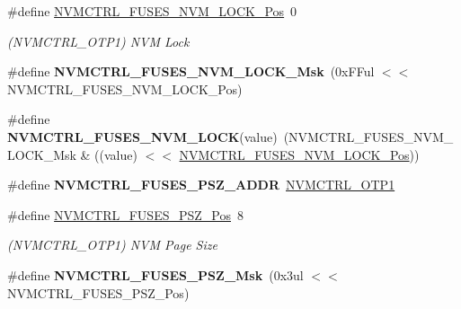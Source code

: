 \begin{DoxyCompactItemize}
\item 
\hypertarget{group__fuses__api_ga54fc50fd04594f4183baf9a51d5ff8e9}{}\#define \hyperlink{group__fuses__api_ga54fc50fd04594f4183baf9a51d5ff8e9}{N\+V\+M\+C\+T\+R\+L\+\_\+\+F\+U\+S\+E\+S\+\_\+\+N\+V\+M\+\_\+\+L\+O\+C\+K\+\_\+\+Pos}~0\label{group__fuses__api_ga54fc50fd04594f4183baf9a51d5ff8e9}

\begin{DoxyCompactList}\small\item\em (N\+V\+M\+C\+T\+R\+L\+\_\+\+O\+T\+P1) N\+V\+M Lock \end{DoxyCompactList}\item 
\hypertarget{group__fuses__api_ga2a99d48671efe5519af35a0749175ddd}{}\#define {\bfseries N\+V\+M\+C\+T\+R\+L\+\_\+\+F\+U\+S\+E\+S\+\_\+\+N\+V\+M\+\_\+\+L\+O\+C\+K\+\_\+\+Msk}~(0x\+F\+Ful $<$$<$ N\+V\+M\+C\+T\+R\+L\+\_\+\+F\+U\+S\+E\+S\+\_\+\+N\+V\+M\+\_\+\+L\+O\+C\+K\+\_\+\+Pos)\label{group__fuses__api_ga2a99d48671efe5519af35a0749175ddd}

\item 
\hypertarget{group__fuses__api_ga518470e6884a1b5a283df85948352b4d}{}\#define {\bfseries N\+V\+M\+C\+T\+R\+L\+\_\+\+F\+U\+S\+E\+S\+\_\+\+N\+V\+M\+\_\+\+L\+O\+C\+K}(value)~(N\+V\+M\+C\+T\+R\+L\+\_\+\+F\+U\+S\+E\+S\+\_\+\+N\+V\+M\+\_\+\+L\+O\+C\+K\+\_\+\+Msk \& ((value) $<$$<$ \hyperlink{group__fuses__api_ga54fc50fd04594f4183baf9a51d5ff8e9}{N\+V\+M\+C\+T\+R\+L\+\_\+\+F\+U\+S\+E\+S\+\_\+\+N\+V\+M\+\_\+\+L\+O\+C\+K\+\_\+\+Pos}))\label{group__fuses__api_ga518470e6884a1b5a283df85948352b4d}

\item 
\hypertarget{group__fuses__api_ga091c7224e520cdc69ccfc096ceeea7c3}{}\#define {\bfseries N\+V\+M\+C\+T\+R\+L\+\_\+\+F\+U\+S\+E\+S\+\_\+\+P\+S\+Z\+\_\+\+A\+D\+D\+R}~\hyperlink{group___s_a_m_l21_j18_a__base_ga6ebf76a96eae94342ff79fce4311baf3}{N\+V\+M\+C\+T\+R\+L\+\_\+\+O\+T\+P1}\label{group__fuses__api_ga091c7224e520cdc69ccfc096ceeea7c3}

\item 
\hypertarget{group__fuses__api_gaea11bcd13d9dca02cf64ca6fd5d2da50}{}\#define \hyperlink{group__fuses__api_gaea11bcd13d9dca02cf64ca6fd5d2da50}{N\+V\+M\+C\+T\+R\+L\+\_\+\+F\+U\+S\+E\+S\+\_\+\+P\+S\+Z\+\_\+\+Pos}~8\label{group__fuses__api_gaea11bcd13d9dca02cf64ca6fd5d2da50}

\begin{DoxyCompactList}\small\item\em (N\+V\+M\+C\+T\+R\+L\+\_\+\+O\+T\+P1) N\+V\+M Page Size \end{DoxyCompactList}\item 
\hypertarget{group__fuses__api_ga1b83b9fe9ee6d60d95a35566a1fc3049}{}\#define {\bfseries N\+V\+M\+C\+T\+R\+L\+\_\+\+F\+U\+S\+E\+S\+\_\+\+P\+S\+Z\+\_\+\+Msk}~(0x3ul $<$$<$ N\+V\+M\+C\+T\+R\+L\+\_\+\+F\+U\+S\+E\+S\+\_\+\+P\+S\+Z\+\_\+\+Pos)\label{group__fuses__api_ga1b83b9fe9ee6d60d95a35566a1fc3049}


\end{DoxyCompactItemize}
